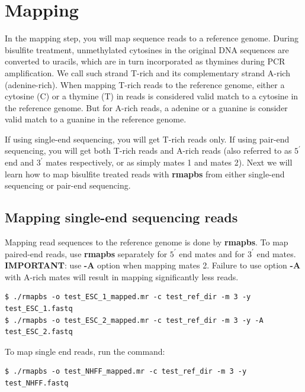 \documentclass{article}
\begin{document}
\section{Mapping}
\label{sec:mapping}


In the mapping step, you will map sequence reads to a reference
genome. During bisulfite treatment, unmethylated cytosines in the
original DNA sequences are converted to uracils, which are in turn
incorporated as thymines during PCR amplification. We call such strand
T-rich and its complementary strand A-rich (adenine-rich).  When
mapping T-rich reads to the reference genome, either a cytosine (C) or
a thymine (T) in reads is considered valid match to a cytosine in the
reference genome. But for A-rich reads, a adenine or a guanine is
consider valid match to a guanine in the reference genome.    

If using single-end sequencing, you will get T-rich reads only. If
using pair-end sequencing, you will get both T-rich reads and A-rich
reads (also referred to as $5^{\prime}$ end and $3^{\prime}$ mates respectively,
or as simply mates 1 and mates 2). 
Next we will learn how to map bisulfite treated reads with
\textbf{rmapbs} from either single-end sequencing or pair-end
sequencing. 

\subsection{Mapping single-end sequencing reads}
\label{sec:mapping-single-end}
Mapping read sequences to the reference genome is done by
\textbf{rmapbs}. To map paired-end reads, use \textbf{rmapbs} separately for 
$5^{\prime}$ end mates and for $3^{\prime}$ end mates. \textbf{IMPORTANT}:
use \textbf{-A} option when mapping mates 2. Failure to use option \textbf{-A}
with A-rich mates will result in mapping significantly less reads.

\begin{verbatim}
$ ./rmapbs -o test_ESC_1_mapped.mr -c test_ref_dir -m 3 -y test_ESC_1.fastq
$ ./rmapbs -o test_ESC_2_mapped.mr -c test_ref_dir -m 3 -y -A test_ESC_2.fastq
\end{verbatim}

\begin{flushleft} To map single end reads, run the command: \end{flushleft}
\begin{verbatim}
$ ./rmapbs -o test_NHFF_mapped.mr -c test_ref_dir -m 3 -y test_NHFF.fastq
\end{verbatim}
\end{document}
